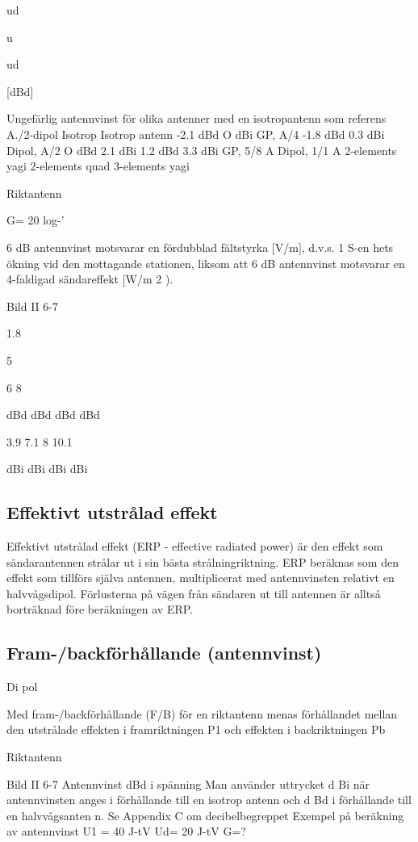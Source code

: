 ud

u

ud

[dBd]

Ungefärlig antennvinst för olika antenner med en isotropantenn som referens
A./2-dipol
Isotrop
Isotrop antenn
-2.1 dBd O
dBi
GP, A/4
-1.8 dBd 0.3 dBi
Dipol, A/2
O
dBd 2.1
dBi
1.2 dBd 3.3 dBi
GP, 5/8 A
Dipol, 1/1 A
2-elements yagi
2-elements quad
3-elements yagi

Riktantenn

G= 20 log-'

6 dB antennvinst motsvarar en fördubblad fältstyrka [V/m], d.v.s. 1 S-en hets ökning
vid den mottagande stationen, liksom att
6 dB antennvinst motsvarar en 4-faldigad
sändareffekt [W/m 2 ).

Bild II 6-7

1.8

5

6
8

dBd
dBd
dBd
dBd

3.9
7.1
8
10.1

dBi
dBi
dBi
dBi

\subsection{Effektivt utstrålad effekt}

Effektivt utstrålad effekt (ERP - effective
radiated power) är den effekt som sändarantennen strålar ut i sin bästa strålningriktning. ERP beräknas som den effekt som
tillförs själva antennen, multiplicerat med
antennvinsten relativt en halvvågsdipol. Förlusterna på vägen från sändaren ut till antennen är alltså borträknad före beräkningen
av ERP.

\subsection{Fram-/backförhållande (antennvinst)}

Di pol

Med fram-/backförhållande (F/B) för en riktantenn menas förhållandet mellan den utstrålade effekten i framriktningen P1 och
effekten i backriktningen Pb

Riktantenn

Bild II 6-7 Antennvinst dBd i spänning
Man använder uttrycket d Bi när antennvinsten anges i förhållande till en isotrop
antenn och d Bd i förhållande till en halvvågsanten n.
Se Appendix C om decibelbegreppet
Exempel på beräkning av antennvinst
U1 = 40 J-tV Ud= 20 J-tV
G=?

